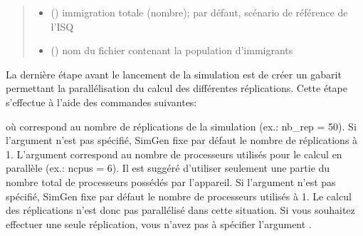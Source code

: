 \documentclass[letterpaper,10pt,french]{sphinxmanual}
\begin{document}
\begin{fulllineitems}
\begin{fulllineitems}
\begin{quote}
\begin{description}
\begin{itemize}
\item {} 
 () \textendash{} immigration totale (nombre); par défaut, scénario de référence de l’ISQ

\item {} 
 () \textendash{} nom du fichier contenant la population d’immigrants

\end{itemize}

\end{description}\end{quote}

\end{fulllineitems}


\end{fulllineitems}


\begin{DUlineblock}{0em}
\item[] 
\end{DUlineblock}

La dernière étape avant le lancement de la simulation est de créer un gabarit permettant la parallélisation
du calcul des différentes réplications. Cette étape s’effectue à l’aide des commandes suivantes:

\begin{sphinxVerbatim}[commandchars=\\\{\}]
  
\end{sphinxVerbatim}

où  correspond au nombre de réplications de la simulation (ex.: nb\_rep = 50). Si l’argument  n’est pas spécifié, SimGen fixe par défaut le nombre de réplications à 1.
L’argument  correspond au nombre de processeurs utilisés pour le calcul en parallèle (ex.: ncpus = 6).
Il est suggéré d’utiliser seulement une partie du nombre total de processeurs possédés par l’appareil.
Si l’argument  n’est pas spécifié, SimGen fixe par défaut le nombre de processeurs utilisés à 1.
Le calcul des réplications n’est donc pas parallélisé dans cette situation. Si vous souhaitez effectuer une seule réplication, vous n’avez pas à spécifier l’argument .
\end{document}
